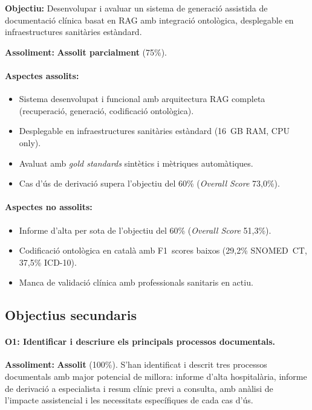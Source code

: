 \documentclass[CAT]{TFUOC}%
\begin{document}
\textbf{Objectiu:} Desenvolupar i avaluar un sistema de generació assistida de documentació clínica basat en RAG amb integració ontològica, desplegable en infraestructures sanitàries estàndard.

\textbf{Assoliment:} \textbf{Assolit parcialment} (75\%).

\paragraph{Aspectes assolits:}
\begin{itemize}
    \item Sistema desenvolupat i funcional amb arquitectura RAG completa (recuperació, generació, codificació ontològica).
    \item Desplegable en infraestructures sanitàries estàndard (16~GB RAM, CPU only).
    \item Avaluat amb \textit{gold standards} sintètics i mètriques automàtiques.
    \item Cas d'ús de derivació supera l'objectiu del 60\% (\textit{Overall Score} 73,0\%).
\end{itemize}

\paragraph{Aspectes no assolits:}
\begin{itemize}
    \item Informe d'alta per sota de l'objectiu del 60\% (\textit{Overall Score} 51,3\%).
    \item Codificació ontològica en català amb F1~scores baixos (29,2\% SNOMED~CT, 37,5\% ICD-10).
    \item Manca de validació clínica amb professionals sanitaris en actiu.
\end{itemize}

\subsection{Objectius secundaris}

\paragraph{O1: Identificar i descriure els principals processos documentals.}
\textbf{Assoliment:} \textbf{Assolit} (100\%). S'han identificat i descrit tres processos documentals amb major potencial de millora: informe d'alta hospitalària, informe de derivació a especialista i resum clínic previ a consulta, amb anàlisi de l'impacte assistencial i les necessitats específiques de cada cas d'ús.
\end{document}
